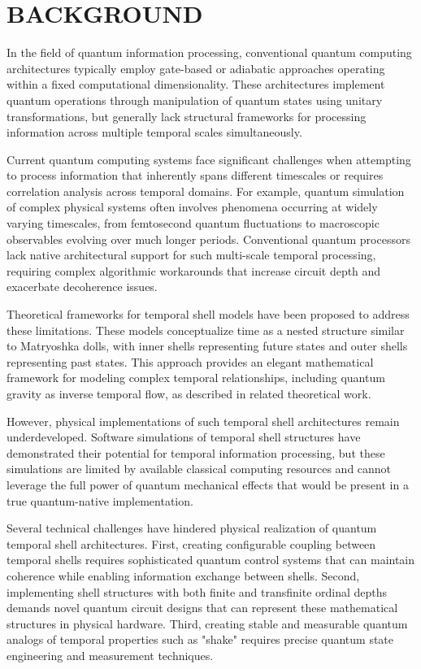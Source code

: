 \documentclass[12pt,letterpaper]{article}
\begin{document}
\section*{BACKGROUND}

In the field of quantum information processing, conventional quantum computing architectures typically employ gate-based or adiabatic approaches operating within a fixed computational dimensionality. These architectures implement quantum operations through manipulation of quantum states using unitary transformations, but generally lack structural frameworks for processing information across multiple temporal scales simultaneously.

Current quantum computing systems face significant challenges when attempting to process information that inherently spans different timescales or requires correlation analysis across temporal domains. For example, quantum simulation of complex physical systems often involves phenomena occurring at widely varying timescales, from femtosecond quantum fluctuations to macroscopic observables evolving over much longer periods. Conventional quantum processors lack native architectural support for such multi-scale temporal processing, requiring complex algorithmic workarounds that increase circuit depth and exacerbate decoherence issues.

Theoretical frameworks for temporal shell models have been proposed to address these limitations. These models conceptualize time as a nested structure similar to Matryoshka dolls, with inner shells representing future states and outer shells representing past states. This approach provides an elegant mathematical framework for modeling complex temporal relationships, including quantum gravity as inverse temporal flow, as described in related theoretical work.

However, physical implementations of such temporal shell architectures remain underdeveloped. Software simulations of temporal shell structures have demonstrated their potential for temporal information processing, but these simulations are limited by available classical computing resources and cannot leverage the full power of quantum mechanical effects that would be present in a true quantum-native implementation.

Several technical challenges have hindered physical realization of quantum temporal shell architectures. First, creating configurable coupling between temporal shells requires sophisticated quantum control systems that can maintain coherence while enabling information exchange between shells. Second, implementing shell structures with both finite and transfinite ordinal depths demands novel quantum circuit designs that can represent these mathematical structures in physical hardware. Third, creating stable and measurable quantum analogs of temporal properties such as "shake" requires precise quantum state engineering and measurement techniques.
\end{document}
